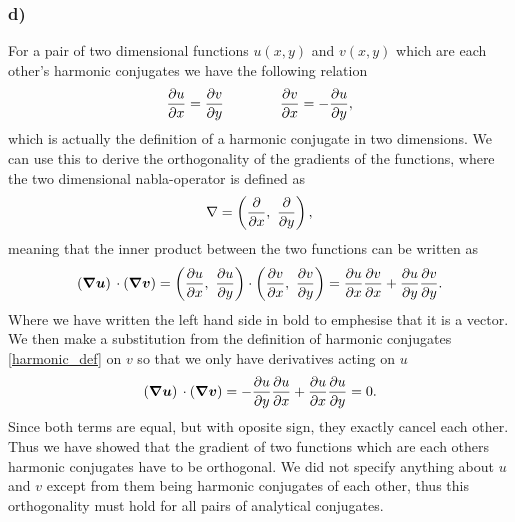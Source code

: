 \documentclass[12pt,twoside]{article}
\begin{document}
\subsubsection*{d)}
For a pair of two dimensional functions $u(x, y)$ and $v(x, y)$ which are each other's harmonic conjugates we have the following relation
\begin{equation}
  \pdv{u}{x} = \pdv{v}{y} \qquad \qquad \pdv{v}{x} = - \pdv{u}{y}, \label{harmonic_def}
\end{equation}
which is actually the definition of a harmonic conjugate in two dimensions.
We can use this to derive the orthogonality of the gradients of the functions, where the two dimensional nabla-operator is defined as
\begin{equation}
  \nabla = \left( \pdv{}{x}, \,\, \pdv{}{y} \right),
\end{equation}
meaning that the inner product between the two functions can be written as
\begin{equation}
  \left( {\boldsymbol{{ \nabla u}}} \right) \,\cdot   \left( {\boldsymbol{{ \nabla v}}} \right) = \left( \pdv{u}{x}, \,\, \pdv{u}{y} \right)\cdot \left( \pdv{v}{x}, \,\, \pdv{v}{y} \right) = \pdv{u}{x}\pdv{v}{x} + \pdv{u}{y}\pdv{v}{y}.
\end{equation}
Where we have written the left hand side in bold to emphesise that it is a vector. We then make a substitution from the definition of harmonic conjugates \eqref{harmonic_def} on $v$ so that we only have derivatives acting on $u$
\begin{equation}
  \left( {\boldsymbol{{ \nabla u}}} \right) \,\cdot   \left( {\boldsymbol{{ \nabla v}}} \right) = -\pdv{u}{y}\pdv{u}{x} + \pdv{u}{x}\pdv{u}{y} = 0.
\end{equation}
Since both terms are equal, but with oposite sign, they exactly cancel each other. Thus we have showed that the gradient of two functions which are each others harmonic conjugates have to be orthogonal. We did not specify anything about $u$ and $v$ except from them being harmonic conjugates of each other, thus this orthogonality must hold for all pairs of analytical conjugates.
\end{document}
